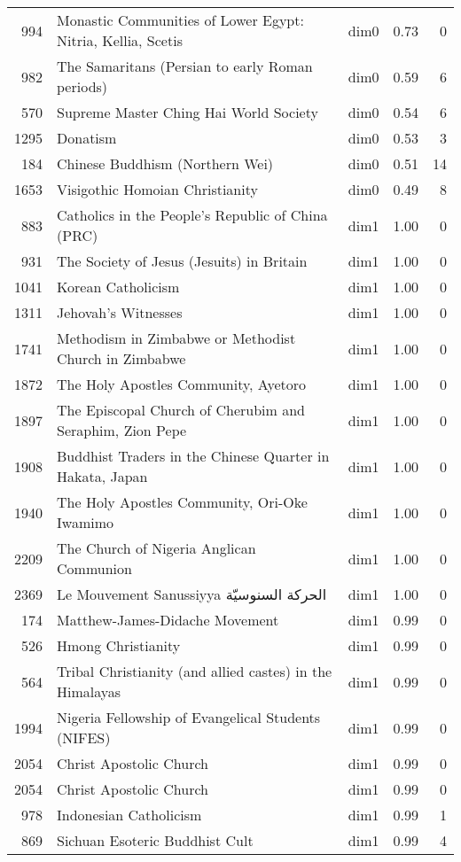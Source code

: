 \begin{tabular}{rllrr}
994 & Monastic Communities of Lower Egypt: Nitria, Kellia, Scetis & dim0 & 0.73 & 0 \\
982 & The Samaritans (Persian to early Roman periods) & dim0 & 0.59 & 6 \\
570 & Supreme Master Ching Hai World Society & dim0 & 0.54 & 6 \\
1295 & Donatism & dim0 & 0.53 & 3 \\
184 & Chinese Buddhism (Northern Wei) & dim0 & 0.51 & 14 \\
1653 & Visigothic Homoian Christianity & dim0 & 0.49 & 8 \\
883 & Catholics in the People's Republic of China (PRC) & dim1 & 1.00 & 0 \\
931 & The Society of Jesus (Jesuits) in Britain & dim1 & 1.00 & 0 \\
1041 & Korean Catholicism & dim1 & 1.00 & 0 \\
1311 & Jehovah's Witnesses & dim1 & 1.00 & 0 \\
1741 & Methodism in Zimbabwe or Methodist Church in Zimbabwe & dim1 & 1.00 & 0 \\
1872 & The Holy Apostles Community, Ayetoro & dim1 & 1.00 & 0 \\
1897 & The Episcopal Church of Cherubim and Seraphim, Zion Pepe & dim1 & 1.00 & 0 \\
1908 & Buddhist Traders in the Chinese Quarter in Hakata, Japan & dim1 & 1.00 & 0 \\
1940 & The Holy Apostles Community, Ori-Oke Iwamimo & dim1 & 1.00 & 0 \\
2209 & The Church of Nigeria Anglican Communion & dim1 & 1.00 & 0 \\
2369 & Le Mouvement Sanussiyya الحركة السنوسيّة & dim1 & 1.00 & 0 \\
174 & Matthew-James-Didache Movement & dim1 & 0.99 & 0 \\
526 & Hmong Christianity & dim1 & 0.99 & 0 \\
564 & Tribal Christianity (and allied castes) in the Himalayas & dim1 & 0.99 & 0 \\
1994 & Nigeria Fellowship of Evangelical Students (NIFES) & dim1 & 0.99 & 0 \\
2054 & Christ Apostolic Church & dim1 & 0.99 & 0 \\
2054 & Christ Apostolic Church & dim1 & 0.99 & 0 \\
978 & Indonesian Catholicism & dim1 & 0.99 & 1 \\
869 & Sichuan Esoteric Buddhist Cult & dim1 & 0.99 & 4 \\

\end{tabular}
